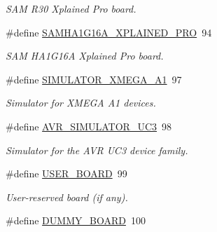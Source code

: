\begin{DoxyCompactItemize}
\begin{DoxyCompactList}\small\item\em S\+A\+M R30 Xplained Pro board. \end{DoxyCompactList}\item 
\hypertarget{group__group__common__boards_ga0752b49586742861982f51843b2ac76b}{}\#define \hyperlink{group__group__common__boards_ga0752b49586742861982f51843b2ac76b}{S\+A\+M\+H\+A1\+G16\+A\+\_\+\+X\+P\+L\+A\+I\+N\+E\+D\+\_\+\+P\+R\+O}~94\label{group__group__common__boards_ga0752b49586742861982f51843b2ac76b}

\begin{DoxyCompactList}\small\item\em S\+A\+M H\+A1\+G16\+A Xplained Pro board. \end{DoxyCompactList}\item 
\hypertarget{group__group__common__boards_ga1c9dfe8403ed817c13fc6031956b1635}{}\#define \hyperlink{group__group__common__boards_ga1c9dfe8403ed817c13fc6031956b1635}{S\+I\+M\+U\+L\+A\+T\+O\+R\+\_\+\+X\+M\+E\+G\+A\+\_\+\+A1}~97\label{group__group__common__boards_ga1c9dfe8403ed817c13fc6031956b1635}

\begin{DoxyCompactList}\small\item\em Simulator for X\+M\+E\+G\+A A1 devices. \end{DoxyCompactList}\item 
\hypertarget{group__group__common__boards_gad93cf08d9dfb95c3c2cfd1cf38c0f2e4}{}\#define \hyperlink{group__group__common__boards_gad93cf08d9dfb95c3c2cfd1cf38c0f2e4}{A\+V\+R\+\_\+\+S\+I\+M\+U\+L\+A\+T\+O\+R\+\_\+\+U\+C3}~98\label{group__group__common__boards_gad93cf08d9dfb95c3c2cfd1cf38c0f2e4}

\begin{DoxyCompactList}\small\item\em Simulator for the A\+V\+R U\+C3 device family. \end{DoxyCompactList}\item 
\hypertarget{group__group__common__boards_ga6e6dffe821337dbaaa12bca06e8e5119}{}\#define \hyperlink{group__group__common__boards_ga6e6dffe821337dbaaa12bca06e8e5119}{U\+S\+E\+R\+\_\+\+B\+O\+A\+R\+D}~99\label{group__group__common__boards_ga6e6dffe821337dbaaa12bca06e8e5119}

\begin{DoxyCompactList}\small\item\em User-\/reserved board (if any). \end{DoxyCompactList}\item 
\#define \hyperlink{group__group__common__boards_gac33d75ae101690822610338fdff2e95b}{D\+U\+M\+M\+Y\+\_\+\+B\+O\+A\+R\+D}~100
\end{DoxyCompactItemize}
